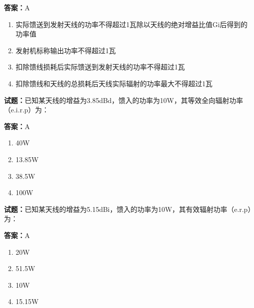 \documentclass{ctexbook}
\begin{document}
\textbf{答案：}A 

\begin{enumerate}[leftmargin=3em]
  \item 实际馈送到发射天线的功率不得超过1瓦除以天线的绝对增益比值Gi后得到的功率值 

  \item 发射机标称输出功率不得超过1瓦 

  \item 扣除馈线损耗后实际馈送到发射天线的功率不得超过1瓦 

  \item 扣除馈线和天线的总损耗后天线实际辐射的功率最大不得超过1瓦 

\end{enumerate}





\vspace{1em}

\textbf{试题：}已知某天线的增益为3.85dBd，馈入的功率为10W，其等效全向辐射功率（e.i.r.p）为： 

\textbf{答案：}A 

\begin{enumerate}[leftmargin=3em]
  \item 40W 

  \item 13.85W 

  \item 38.5W 


  \item 100W 

\end{enumerate}





\vspace{1em}

\textbf{试题：}已知某天线的增益为5.15dBi，馈入的功率为10W，其有效辐射功率（e.r.p）为： 

\textbf{答案：}A 

\begin{enumerate}[leftmargin=3em]
  \item 20W 

  \item 51.5W 

  \item 10W 

  \item 15.15W 

\end{enumerate}
\end{document}
